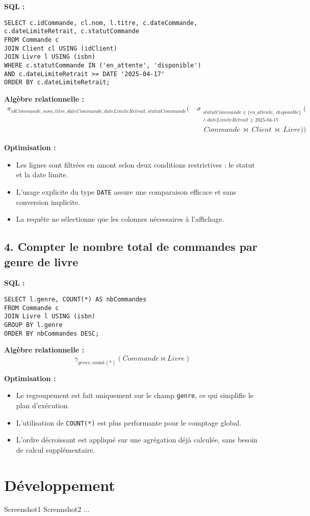 \documentclass{article}
\begin{document}
\textbf{SQL :}
\begin{lstlisting}
SELECT c.idCommande, cl.nom, l.titre, c.dateCommande, c.dateLimiteRetrait, c.statutCommande
FROM Commande c
JOIN Client cl USING (idClient)
JOIN Livre l USING (isbn)
WHERE c.statutCommande IN ('en_attente', 'disponible')
AND c.dateLimiteRetrait >= DATE '2025-04-17'
ORDER BY c.dateLimiteRetrait;
\end{lstlisting}

\textbf{Algèbre relationnelle :}
\begin{align*}
  \pi_{idCommande, nom, titre, dateCommande, dateLimiteRetrait, statutCommande} \Big( \ 
    &\sigma_{\substack{
      statutCommande \in \{en\_attente,\ disponible\} \\
      \land\ dateLimiteRetrait \geq 2025\text{-}04\text{-}17
    }} \Big( \\
    &\hspace{1em} Commande \ \bowtie\ Client \ \bowtie\ Livre \Big) \Big)
\end{align*}

\textbf{Optimisation :}
\begin{itemize}
  \item Les lignes sont filtrées en amont selon deux conditions restrictives : le statut et la date limite.
  \item L’usage explicite du type \texttt{DATE} assure une comparaison efficace et sans conversion implicite.
  \item La requête ne sélectionne que les colonnes nécessaires à l’affichage.
\end{itemize}

\bigskip

\subsection*{4. Compter le nombre total de commandes par genre de livre}

\textbf{SQL :}
\begin{lstlisting}
SELECT l.genre, COUNT(*) AS nbCommandes
FROM Commande c
JOIN Livre l USING (isbn)
GROUP BY l.genre
ORDER BY nbCommandes DESC;
\end{lstlisting}

\textbf{Algèbre relationnelle :}
\[
\gamma_{genre, \text{count}(*)}(Commande \bowtie Livre)
\]

\textbf{Optimisation :}
\begin{itemize}
  \item Le regroupement est fait uniquement sur le champ \texttt{genre}, ce qui simplifie le plan d’exécution.
  \item L’utilisation de \texttt{COUNT(*)} est plus performante pour le comptage global.
  \item L’ordre décroissant est appliqué sur une agrégation déjà calculée, sans besoin de calcul supplémentaire.
\end{itemize}

\section{Développement}

Screenshot1
Scrennshot2
...
\end{document}
